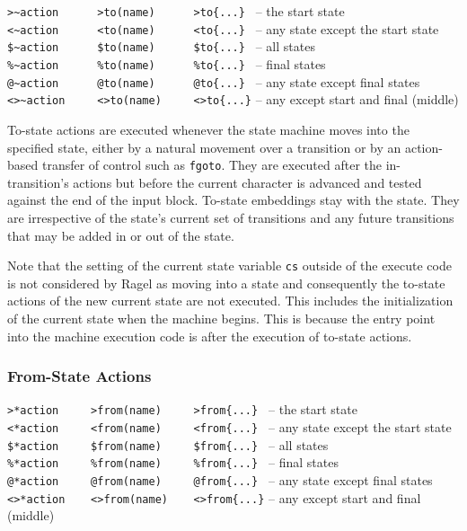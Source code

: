\documentclass[letterpaper,11pt,oneside]{book}
\begin{document}
\hspace*{24pt}\verb|>~action      >to(name)      >to{...} | -- the start state\\
\hspace*{24pt}\verb|<~action      <to(name)      <to{...} | -- any state except the start state\\
\hspace*{24pt}\verb|$~action      $to(name)      $to{...} | -- all states\\
\hspace*{24pt}\verb|%~action      %to(name)      %to{...} | -- final states\\
\hspace*{24pt}\verb|@~action      @to(name)      @to{...} | -- any state except final states\\
\hspace*{24pt}\verb|<>~action     <>to(name)     <>to{...}| -- any except start and final (middle)
\vspace{12pt}


To-state actions are executed whenever the state machine moves into the
specified state, either by a natural movement over a transition or by an
action-based transfer of control such as \verb|fgoto|. They are executed after the
in-transition's actions but before the current character is advanced and
tested against the end of the input block. To-state embeddings stay with the
state. They are irrespective of the state's current set of transitions and any
future transitions that may be added in or out of the state.

Note that the setting of the current state variable \verb|cs| outside of the
execute code is not considered by Ragel as moving into a state and consequently
the to-state actions of the new current state are not executed. This includes
the initialization of the current state when the machine begins.  This is
because the entry point into the machine execution code is after the execution
of to-state actions.

\subsubsection{From-State Actions}

\hspace*{24pt}\verb|>*action     >from(name)     >from{...} | -- the start state\\
\hspace*{24pt}\verb|<*action     <from(name)     <from{...} | -- any state except the start state\\
\hspace*{24pt}\verb|$*action     $from(name)     $from{...} | -- all states\\
\hspace*{24pt}\verb|%*action     %from(name)     %from{...} | -- final states\\
\hspace*{24pt}\verb|@*action     @from(name)     @from{...} | -- any state except final states\\
\hspace*{24pt}\verb|<>*action    <>from(name)    <>from{...}| -- any except start and final (middle)
\vspace{12pt}
\end{document}

